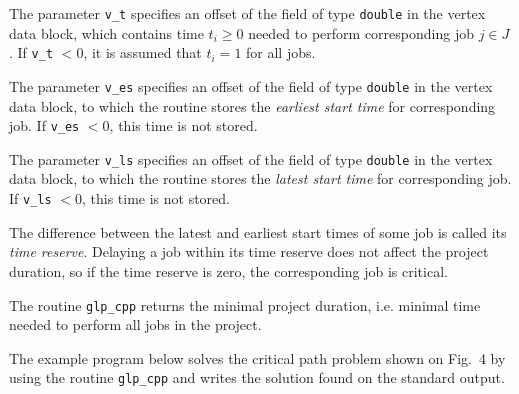 \documentclass[11pt]{report}
\def\para#1{\noindent{\bf#1}}
\begin{document}
The parameter \verb|v_t| specifies an offset of the field of type
\verb|double| in the vertex data block, which contains time $t_i\geq 0$
needed to perform corresponding job $j\in J$. If \verb|v_t| $<0$, it is
assumed that $t_i=1$ for all jobs.

The parameter \verb|v_es| specifies an offset of the field of type
\verb|double| in the vertex data block, to which the routine stores
the {\it earliest start time} for corresponding job. If \verb|v_es|
$<0$, this time is not stored.

\newpage

The parameter \verb|v_ls| specifies an offset of the field of type
\verb|double| in the vertex data block, to which the routine stores
the {\it latest start time} for corresponding job. If \verb|v_ls|
$<0$, this time is not stored.

The difference between the latest and earliest start times of some job
is called its {\it time reserve}. Delaying a job within its time
reserve does not affect the project duration, so if the time reserve is
zero, the corresponding job is critical.

\para{Returns}

The routine \verb|glp_cpp| returns the minimal project duration, i.e.
minimal time needed to perform all jobs in the project.

\para{Example}

The example program below solves the critical path problem shown on
Fig.~4 by using the routine \verb|glp_cpp| and writes the solution
found on the standard output.
\end{document}
